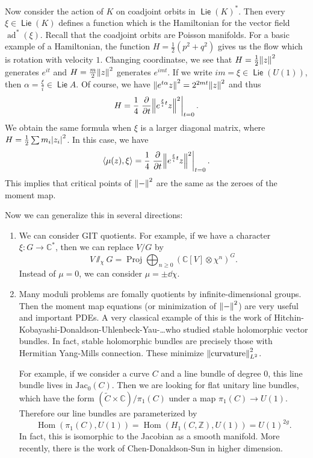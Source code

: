 \documentclass[leqno, openany]{memoir}
\theoremstyle{definition}
\theoremstyle{remark}
\theoremstyle{plain}
\theoremstyle{definition}
\theoremstyle{remark}
\newcommand{\C}{\mathbb{C}}
\newcommand{\Z}{\mathbb{Z}}
\newcommand{\mr}[1]{\mathrm{#1}}
\newcommand{\wtl}[1]{\widetilde{#1}}
\DeclareMathOperator{\Hom}{Hom}
\DeclareMathOperator{\ad}{ad}
\DeclareMathOperator{\Proj}{Proj}
\DeclareMathOperator{\Lie}{\mathsf{Lie}}
\begin{document}
Now consider the action of $K$ on coadjoint orbits in ${\Lie(K)}^*$. Then every
$\xi \in \Lie(K)$ defines a function which is the Hamiltonian for the vector
field $\ad^*(\xi)$. Recall that the coadjoint orbits are Poisson manifolds. For
a basic example of a Hamiltonian, the function $H = \frac{1}{2}(p^2 + q^2)$
gives us the flow which is rotation with velocity $1$. Changing coordinatse, we
see that $H = \frac{1}{2} \norm{z}^2$ generates $e^{it}$ and $H = \frac{m}{2}
\norm{z}^2$ generates $e^{im t}$. If we write $im = \xi \in \Lie(U(1))$, then
$\alpha = \frac{\xi}{i} \in \Lie A$. Of course, we have $\norm{e^{t \alpha}z}^2
= 2^{2mt} \norm{z}^2$ and thus \[ H = \frac{1}{4} \eval{\pdv{t}
\norm{e^{\frac{\xi}{i}t} z}^2}_{t = 0}. \] We obtain the same formula when
$\xi$ is a larger diagonal matrix, where $H = \frac{1}{2} \sum m_i
\abs{z_i}^2$. In this case, we have \[ \ev{\mu(z), \xi} = \frac{1}{4}
\eval{\pdv{t} \norm{e^{\frac{\xi}{i}t}z}^2}_{t = 0}. \] This implies that
critical points of $\norm{-}^2$ are the same as the zeroes of the moment map.

Now we can generalize this in several directions: \begin{enumerate} \item We
    can consider GIT quotients. For example, if we have a character $\xi \colon
    G \to \C^*$, then we can replace $V/G$ by \[ V \sslash_{\chi} G = \Proj
    \bigoplus_{n \geq 0} {(\C[V] \otimes \chi^n)}^G. \] Instead of $\mu = 0$,
    we can consider $\mu = \pm \dd{\chi}$.  \item Many moduli problems are
    fomally quotients by infinite-dimensional groups. Then the moment map
    equations (or minimization of $\norm{-}^2$) are very useful and important
    PDEs. A very classical example of this is the work of
    Hitchin-Kobayashi-Donaldson-Uhlenbeck-Yau-\ldots who studied stable
    holomorphic vector bundles. In fact, stable holomorphic bundles are
    precisely those with Hermitian Yang-Mills connection. These minimize
    $\norm{\text{curvature}}_{L^2}^2$.

        For example, if we consider a curve $C$ and a line bundle of degree
        $0$, this line bundle lives in $\mr{Jac}_0(C)$. Then we are looking for
        flat unitary line bundles, which have the form $(\wtl{C} \times \C) /
        \pi_1(C)$ under a map $\pi_1(C) \to U(1)$. Therefore our line bundles
        are parameterized by \[ \Hom(\pi_1(C), U(1)) = \Hom(H_1(C, \Z), U(1)) =
        {U(1)}^{2g}. \] In fact, this is isomorphic to the Jacobian as a smooth
manifold. More recently, there is the work of Chen-Donaldson-Sun in higher
dimension.  \end{enumerate}
\end{document}
